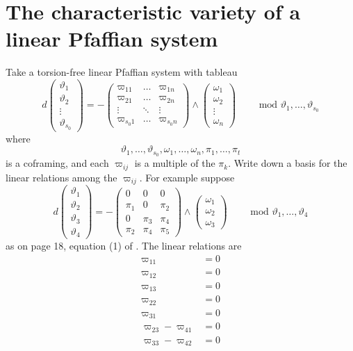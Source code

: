 \section{The characteristic variety of a linear Pfaffian system}
Take a torsion-free linear Pfaffian system with tableau
\[
d 
\begin{pmatrix}
\vartheta_1 \\
\vartheta_2 \\
\vdots \\
\vartheta_{s_0}
\end{pmatrix}
=
-
\begin{pmatrix}
\varpi_{11} & \dots & \varpi_{1n} \\
\varpi_{21} & \dots & \varpi_{2n} \\
\vdots  & \ddots & \vdots \\
\varpi_{s_0 1} & \dots & \varpi_{s_0 n}
\end{pmatrix}
\wedge
\begin{pmatrix}
\omega_1 \\
\omega_2 \\
\vdots \\
\omega_n
\end{pmatrix}
\qquad \text{ mod } \vartheta_1 , \dots , \vartheta_{s_0} 
\]
where 
\[
\vartheta_1 , \dots , \vartheta_{s_0}, \omega_1, \dots , \omega_n,
\pi_1 , \dots , \pi_t
\]
is a coframing, and each \(\varpi_{ij}\) is a multiple of the \(\pi_k\).
Write down a basis for the linear relations among the \(\varpi_{ij}\). 
For example suppose
\[
d 
\begin{pmatrix}
\vartheta_1 \\
\vartheta_2 \\
\vartheta_3 \\
\vartheta_4
\end{pmatrix}
=
-
\begin{pmatrix}
0 & 0 & 0 \\
\pi_1 & 0 & \pi_2 \\
0 & \pi_3 & \pi_4 \\
\pi_2 & \pi_4 & \pi_5
\end{pmatrix}
\wedge
\begin{pmatrix}
\omega_1 \\
\omega_2 \\
\omega_3
\end{pmatrix}
\qquad \text{ mod } \vartheta_1 , \dots , \vartheta_4 
\]
as on page 18, equation (1) of \cite{Cartan:1911}. 
The linear relations are
\begin{align*}
\varpi_{11} &= 0 \\
\varpi_{12} &= 0 \\
\varpi_{13} &= 0 \\
\varpi_{22} &= 0 \\
\varpi_{31} &= 0 \\
\varpi_{23} - \varpi_{41} &= 0 \\
\varpi_{33} - \varpi_{42} &= 0 \\
\end{align*}
